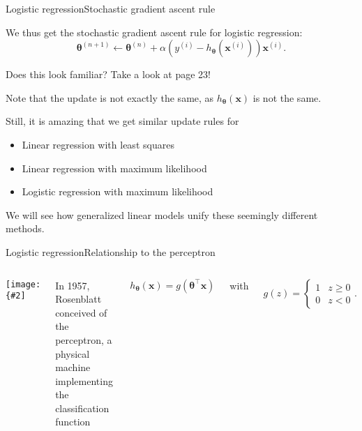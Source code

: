 \documentclass{beamer}
\renewcommand{\vec}[1]{\boldsymbol{#1}}
\newcommand{\myfig}[3]{\centerline{\texttt{[image: \{\#2]}}}
    \centerline{\scriptsize #3}}
\begin{document}
\begin{frame}{Logistic regression}{Stochastic gradient ascent rule}

  We thus get the stochastic gradient ascent rule for logistic regression:
  \[ \vec{\theta}^{(n+1)} \leftarrow \vec{\theta}^{(n)} + \alpha(y^{(i)} -h_{\vec{\theta}}(\vec{x}^{(i)}))\vec{x}^{(i)}. \]

  Does this look familiar? Take a look at page 23!

  \medskip

  Note that the update is not exactly the same, as
  $h_{\vec{\theta}}(\vec{x})$ is not the same.
  
  \medskip

  Still, it is amazing that we get similar update rules for
  \begin{itemize}
  \item Linear regression with least squares
  \item Linear regression with maximum likelihood
  \item Logistic regression with maximum likelihood
  \end{itemize}

  We will see how generalized linear models unify these seemingly
  different methods.
  
\end{frame}


\begin{frame}{Logistic regression}{Relationship to the perceptron}

  \begin{columns}

    \column{2.2in}

    \myfig{2in}{mark-1}{Mark I Perceptron Machine (Wikipedia)}

    \column{2.3in}
    
    In 1957, Rosenblatt conceived of the \alert{perceptron}, a
    physical machine implementing the classification function
    
    \[ h_{\vec{\theta}}(\vec{x}) = g(\vec{\theta}^\top \vec{x}) \]

    with

    \[ g(z) = \begin{cases} 1 & z \ge 0 \\ 0 & z < 0 \end{cases} .\]

  \end{columns}
  
\end{frame}
\end{document}
